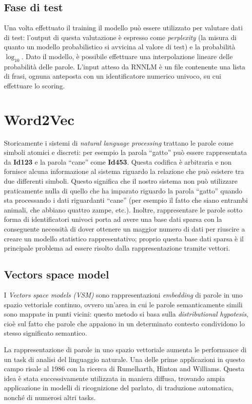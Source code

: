 \documentclass[a4paper,12pt,openright,twoside]{report}
\theoremstyle{definition}
\begin{document}
\subsection{Fase di test}
Una volta effettuato il training il modello può essere utilizzato per valutare dati di test:
l'output di questa valutazione è espresso come \emph{perplexity} (la misura di quanto un modello probabilistico
si avvicina al valore di test) e la 
probabilità $\log_{10}$.
Dato il modello, è possibile effettuare una interpolazione lineare delle probabilità delle parole. L'input atteso
da RNNLM è un file contenente una lista di frasi, ognuna anteposta con un identificatore
numerico univoco, su cui effettuare lo scoring.

\section{Word2Vec}
Storicamente i sistemi di \emph{natural language processing} trattano le parole come simboli atomici e discreti:
per esempio la parola ``gatto'' può essere rappresentata da \textbf{Id123} e la parola ``cane'' come \textbf{Id453}.
Questa codifica è arbitraria e non fornisce alcuna informazione al sistema riguardo la relazione
che può esistere tra due differenti simboli.
Questo significa che il nostro sistema non può utilizzare praticamente nulla di quello che ha imparato
riguardo la parola ``gatto'' quando sta processando i dati riguardanti ``cane'' (per esempio il fatto che siano
entrambi animali, che abbiano quattro zampe, etc.).
Inoltre, rappresentare le parole sotto forma di identificatori univoci porta ad avere una base dati sparsa
con la conseguente necessità di dover ottenere un maggior numero di dati per riuscire a creare un modello
statistico rappresentativo; proprio questa base dati sparsa è il principale problema 
ad essere risolto dalla rappresentazione tramite vettori.

\subsection{Vectors space model}
I \emph{Vectors space models (VSM)} sono rappresentazioni \emph{embedding} di parole in uno spazio vettoriale 
continuo, ovvero un'area in cui le parole
semanticamente simili sono mappate in punti vicini: questo metodo si basa sulla \emph{distributional hypotesis}, 
cioè sul fatto che parole che appaiono in 
un determinato contesto condividono lo stesso significato semantico.

La rappresentazione di parole in uno spazio vettoriale aumenta le performance
di un task di analisi del linguaggio naturale. Una delle prime
applicazioni in questo campo risale al 1986 con la ricerca di Rumelharth, Hinton and Williams.
Questa idea è stata successivamente utilizzata in maniera diffusa, trovando ampia 
applicazione in modelli di ricognizione del parlato,
di traduzione automatica, nonché di numerosi altri tasks.
\end{document}
